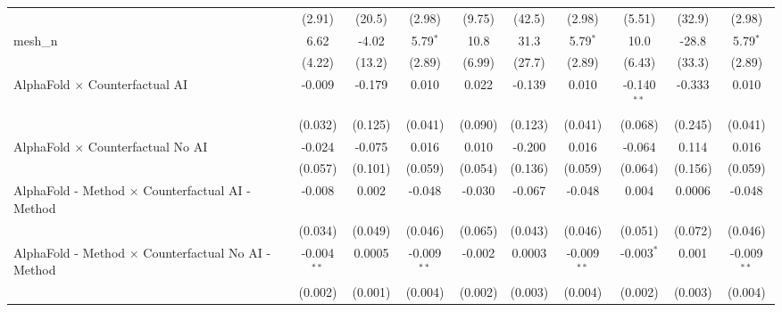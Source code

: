\begin{tabular}{lccccccccc}
                                                               & (2.91)        & (20.5)        & (2.98)        & (9.75)        & (42.5)         & (2.98)        & (5.51)        & (32.9)         & (2.98)\\   
   mesh\_n                                                     & 6.62          & -4.02         & 5.79$^{*}$    & 10.8          & 31.3           & 5.79$^{*}$    & 10.0          & -28.8          & 5.79$^{*}$\\   
                                                               & (4.22)        & (13.2)        & (2.89)        & (6.99)        & (27.7)         & (2.89)        & (6.43)        & (33.3)         & (2.89)\\   
   AlphaFold $\times$ Counterfactual AI                        & -0.009        & -0.179        & 0.010         & 0.022         & -0.139         & 0.010         & -0.140$^{**}$ & -0.333         & 0.010\\   
                                                               & (0.032)       & (0.125)       & (0.041)       & (0.090)       & (0.123)        & (0.041)       & (0.068)       & (0.245)        & (0.041)\\   
   AlphaFold $\times$ Counterfactual No AI                     & -0.024        & -0.075        & 0.016         & 0.010         & -0.200         & 0.016         & -0.064        & 0.114          & 0.016\\   
                                                               & (0.057)       & (0.101)       & (0.059)       & (0.054)       & (0.136)        & (0.059)       & (0.064)       & (0.156)        & (0.059)\\   
   AlphaFold - Method $\times$ Counterfactual AI - Method      & -0.008        & 0.002         & -0.048        & -0.030        & -0.067         & -0.048        & 0.004         & 0.0006         & -0.048\\   
                                                               & (0.034)       & (0.049)       & (0.046)       & (0.065)       & (0.043)        & (0.046)       & (0.051)       & (0.072)        & (0.046)\\   
   AlphaFold - Method $\times$ Counterfactual No AI - Method   & -0.004$^{**}$ & 0.0005        & -0.009$^{**}$ & -0.002        & 0.0003         & -0.009$^{**}$ & -0.003$^{*}$  & 0.001          & -0.009$^{**}$\\   
                                                               & (0.002)       & (0.001)       & (0.004)       & (0.002)       & (0.003)        & (0.004)       & (0.002)       & (0.003)        & (0.004)\\   

\end{tabular}

